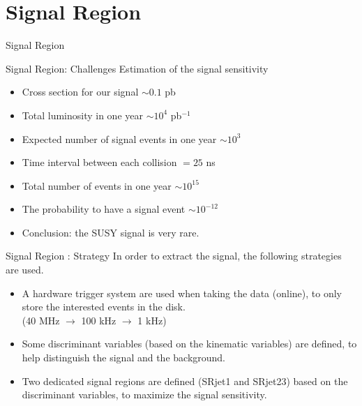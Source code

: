 \documentclass[mathserif,serif]{beamer}
\begin{document}
\section{Signal Region}
\begin{frame}
\begin{center}
\huge
Signal Region
\end{center}
\end{frame}

\begin{frame}{Signal Region: Challenges}
Estimation of the signal sensitivity
\begin{itemize}
\item Cross section for our signal $\sim 0.1$ pb
\item Total luminosity in one year $\sim 10^4$ pb$^{-1}$
\item Expected number of signal events in one year $\sim 10^3$
\end{itemize}
\begin{itemize}
\item Time interval between each collision $= 25$ ns
\item Total number of events in one year $\sim 10^{15}$
\item The probability to have a signal event $\sim 10^{-12}$
\item Conclusion: the SUSY signal is very rare.
\end{itemize}
\end{frame}

\begin{frame}{Signal Region : Strategy}
In order to extract the signal, the following strategies are used.
\begin{itemize}
\item A hardware trigger system are used when taking the data (online), to only store the interested events in the disk. \\
(40 MHz $\rightarrow$ 100 kHz $\rightarrow$ 1 kHz)
\item Some discriminant variables (based on the kinematic variables) are defined, to help distinguish the signal and the background.
\item Two dedicated signal regions are defined (SRjet1 and SRjet23) based on the discriminant variables, to maximize the signal sensitivity.
\end{itemize}
\end{frame}
\end{document}
